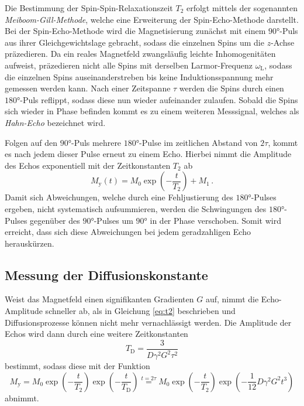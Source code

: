 Die Bestimmung der Spin-Spin-Relaxationszeit $T_2$ erfolgt mittels der sogenannten \textit{Meiboom-Gill-Methode}, welche eine Erweiterung der Spin-Echo-Methode darstellt.
Bei der Spin-Echo-Methode wird die Magnetisierung zunächst mit einem $90°$-Puls aus ihrer Gleichgewichtslage gebracht, sodass die einzelnen Spins um die $z$-Achse präzedieren.
Da ein reales Magnetfeld zwangsläufig leichte Inhomogenitäten aufweist, präzedieren nicht alle Spins mit derselben Larmor-Frequenz $\omega_\text{L}$, sodass die einzelnen Spins auseinanderstreben bis keine Induktionsspannung mehr gemessen werden kann.
Nach einer Zeitspanne $\tau$ werden die Spins durch einen $180°$-Puls reflippt, sodass diese nun wieder aufeinander zulaufen.
Sobald die Spins sich wieder in Phase befinden kommt es zu einem weiteren Messsignal, welches als \textit{Hahn-Echo} bezeichnet wird.

Folgen auf den $90°$-Puls mehrere $180°$-Pulse im zeitlichen Abstand von $2\tau$, kommt es nach jedem dieser Pulse erneut zu einem Echo.
Hierbei nimmt die Amplitude des Echos exponentiell mit der Zeitkonstanten $T_2$ ab
\begin{equation}
    M_\text{y}(t)=M_0\exp(-\frac{t}{T_2}) + M_1\, . \label{eq:t2}
\end{equation}
Damit sich Abweichungen, welche durch eine Fehljustierung des $180°$-Pulses ergeben, nicht systematisch aufsummieren, werden die Schwingungen des $180°$-Pulses gegenüber des $90°$-Pulses um $90°$ in der Phase verschoben.
Somit wird erreicht, dass sich diese Abweichungen bei jedem geradzahligen Echo herauskürzen.

\subsection{Messung der Diffusionskonstante}
Weist das Magnetfeld einen signifikanten Gradienten $G$ auf, nimmt die Echo-Amplitude schneller ab, als in Gleichung \eqref{eq:t2} beschrieben und Diffusionsprozesse können nicht mehr vernachlässigt werden.
Die Amplitude der Echos wird dann durch eine weitere Zeitkonstanten
\begin{equation}
    T_\text{D}=\frac{3}{D\gamma^2 G^2\tau^2} \label{eq:td}
\end{equation}
bestimmt, sodass diese mit der Funktion
\begin{equation}
    M_\text{y}=M_0\exp(-\frac{t}{T_2})\exp(-\frac{t}{T_\text{D}}) \stackrel{t=2\tau}{=} M_0\exp(-\frac{t}{T_2})\exp(-\frac{1}{12}D\gamma^2 G^2 t^3)
    \label{eq:echo}
\end{equation}
abnimmt.





